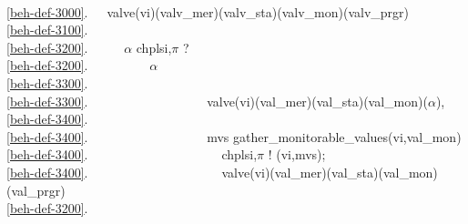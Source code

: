 \mnewfoil
\bp
{}\\
\ref{beh-def-3000}.\ \ \ valve(vi)(valv\_mer)(valv\_sta)(valv\_mon)(valv\_prgr) {\IS} \ \ \\
\ref{beh-def-3100}.\ \ \ \ \ \ {\DOTDOTDOT}\\
\ref{beh-def-3200}.\ \ \ \ \ {\NONDETCHOICE}  $\alpha$ {\EQ} ch{\LBRACKET}{\LBRACE}plsi,$\pi${\RBRACE}{\RBRACKET} ? \\
\ref{beh-def-3200}.\ \ \ \ \ \ \ \ \  $\alpha$ \\
\ref{beh-def-3300}.\ \ \ \ \ \ \ \ \ \ \ \ \  {\VEE} \\
\ref{beh-def-3300}.\ \ \ \ \ \ \ \ \ \ \ \ \ \ \ \ \ \ {\RIGHTARROW} valve(vi)(val\_mer)(val\_sta)(val\_mon)($\alpha$)\footnotemark {}, \\
\ref{beh-def-3400}.\ \ \ \ \ \ \ \ \ \ \ \ \ \ \ \\
\ref{beh-def-3400}.\ \ \ \ \ \ \ \ \ \ \ \ \ \ \ \ \ \ {\RIGHTARROW}  mvs {\EQ} gather\_monitorable\_values(vi,val\_mon) \\
\ref{beh-def-3400}.\ \ \ \ \ \ \ \ \ \ \ \ \ \ \ \ \ \ \ \ \ ch{\LBRACKET}{\LBRACE}plsi,$\pi${\RBRACE}{\RBRACKET} ! (vi,mvs);\\
\ref{beh-def-3400}.\ \ \ \ \ \ \ \ \ \ \ \ \ \ \ \ \ \ \ \ \ valve(vi)(val\_mer)(val\_sta)(val\_mon)(val\_prgr) \\
\ref{beh-def-3200}.\ \ \ \ \ \ \ \ \ 
\ep
{}

